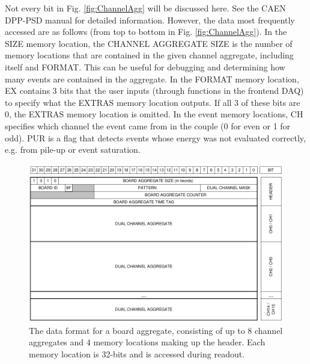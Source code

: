 Not every bit in Fig. \ref{fig:ChannelAgg} will be discussed here. See the CAEN DPP-PSD manual for detailed information. However, the data most frequently accessed are as follows (from top to bottom in Fig. \ref{fig:ChannelAgg}). In the SIZE memory location, the CHANNEL AGGREGATE SIZE is the number of memory locations that are contained in the given channel aggregate, including itself and FORMAT. This can be useful for debugging and determining how many events are contained in the aggregate. In the FORMAT memory location, EX contains 3 bits that the user inputs (through functions in the frontend DAQ) to specify what the EXTRAS memory location outputs. If all 3 of these bits are 0, the EXTRAS memory location is omitted. In the event memory locations, CH specifies which channel the event came from in the couple (0 for even or 1 for odd). PUR is a flag that detects events whose energy was not evaluated correctly, e.g. from pile-up or event saturation. 



\begin{figure}[t]
\centering
\includegraphics[width=6.5in]{Chapter-5/figs/BoardAgg.png}
\caption{\label{fig:BoardAgg}The data format for a board aggregate, consisting of up to 8 channel aggregates and 4 memory locations making up the header. Each memory location is 32-bits and is accessed during readout.}
\end{figure}

